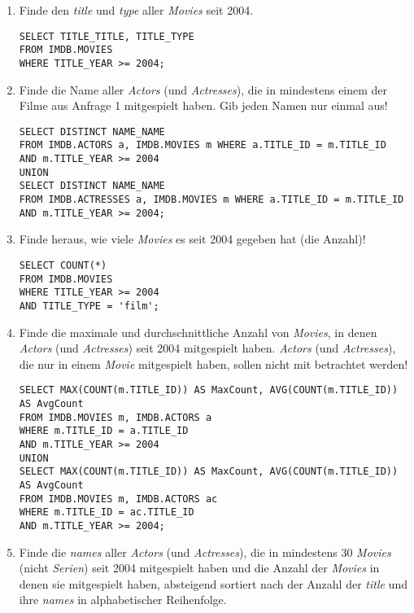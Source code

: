 \documentclass[11pt,a4paper,DIV=9]{scrartcl}
\begin{document}
\begin{enumerate}

\item Finde den \textit{title} und \textit{type} aller \textit{Movies} seit 2004. 
\begin{lstlisting} 
SELECT TITLE_TITLE, TITLE_TYPE
FROM IMDB.MOVIES
WHERE TITLE_YEAR >= 2004;
\end{lstlisting}

\item Finde die Name aller \textit{Actors} (und \textit{Actresses}), die in mindestens einem der Filme aus Anfrage 1 mitgespielt haben. Gib jeden Namen nur einmal aus!
\begin{lstlisting}
SELECT DISTINCT NAME_NAME
FROM IMDB.ACTORS a, IMDB.MOVIES m WHERE a.TITLE_ID = m.TITLE_ID
AND m.TITLE_YEAR >= 2004
UNION
SELECT DISTINCT NAME_NAME
FROM IMDB.ACTRESSES a, IMDB.MOVIES m WHERE a.TITLE_ID = m.TITLE_ID
AND m.TITLE_YEAR >= 2004;
\end{lstlisting}

\item Finde heraus, wie viele \textit{Movies} es seit 2004 gegeben hat (die Anzahl)!
\begin{lstlisting}
SELECT COUNT(*)
FROM IMDB.MOVIES
WHERE TITLE_YEAR >= 2004
AND TITLE_TYPE = 'film';
\end{lstlisting}

\item Finde die maximale und durchschnittliche Anzahl von \textit{Movies}, in denen \textit{Actors} (und \textit{Actresses}) seit 2004 mitgespielt haben. \textit{Actors} (und \textit{Actresses}), die nur in einem \textit{Movie} mitgespielt haben, sollen nicht mit betrachtet werden!
\begin{lstlisting}
SELECT MAX(COUNT(m.TITLE_ID)) AS MaxCount, AVG(COUNT(m.TITLE_ID)) AS AvgCount
FROM IMDB.MOVIES m, IMDB.ACTORS a
WHERE m.TITLE_ID = a.TITLE_ID
AND m.TITLE_YEAR >= 2004
UNION
SELECT MAX(COUNT(m.TITLE_ID)) AS MaxCount, AVG(COUNT(m.TITLE_ID)) AS AvgCount
FROM IMDB.MOVIES m, IMDB.ACTORS ac
WHERE m.TITLE_ID = ac.TITLE_ID
AND m.TITLE_YEAR >= 2004;
\end{lstlisting}

\item Finde die \textit{names} aller \textit{Actors} (und \textit{Actresses}), die in mindestens 30 \textit{Movies} (nicht \textit{Serien}) seit 2004 mitgespielt haben und die Anzahl der \textit{Movies} in denen sie mitgespielt haben, absteigend sortiert nach der Anzahl der \textit{title} und ihre \textit{names} in alphabetischer Reihenfolge.
\begin{lstlisting}
\end{lstlisting}
\end{enumerate}
\end{document}
